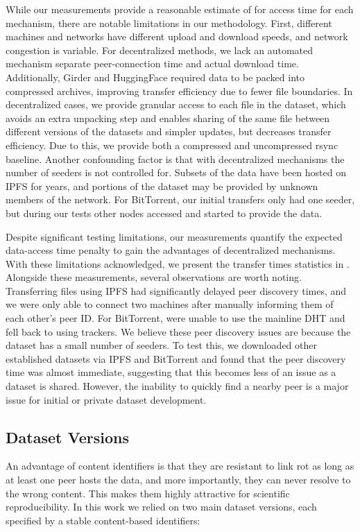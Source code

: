 While our measurements provide a reasonable estimate of for access time for each mechanism, there are
  notable limitations in our methodology.
First, different machines and networks have different upload and download speeds, and network congestion is
  variable.
For decentralized methods, we lack an automated mechanism separate peer-connection time and actual download
  time.
Additionally, Girder and HuggingFace required data to be packed into compressed archives, improving transfer
  efficiency due to fewer file boundaries.
In decentralized cases, we provide granular access to each file in the dataset, which avoids an extra
  unpacking step and enables sharing of the same file between different versions of the datasets and simpler
  updates, but decreases transfer efficiency.
Due to this, we provide both a compressed and uncompressed rsync baseline.
Another confounding factor is that with decentralized mechanisms the number of seeders is not controlled
  for.
Subsets of the data have been hosted on IPFS for years, and portions of the dataset may be provided by
  unknown members of the network.
For BitTorrent, our initial transfers only had one seeder, but during our tests other nodes accessed and
  started to provide the data.

Despite significant testing limitations, our measurements quantify the expected data-access time penalty to
  gain the advantages of decentralized mechanisms.
With these limitations acknowledged, we present the transfer times statistics in .
Alongside these measurements, several observations are worth noting.
Transferring files using IPFS had significantly delayed peer discovery times, and we were only able to
  connect two machines after manually informing them of each other's peer ID.
For BitTorrent, were unable to use the mainline DHT and fell back to using trackers.
We believe these peer discovery issues are because the dataset has a small number of seeders.
To test this, we downloaded other established datasets via IPFS and BitTorrent and found that the peer
  discovery time was almost immediate, suggesting that this becomes less of an issue as a dataset is shared.
However, the inability to quickly find a nearby peer is a major issue for initial or private dataset
  development.


\subsection{Dataset Versions}

An advantage of content identifiers is that they are resistant to link rot as long as at least one peer
  hosts the data, and more importantly, they can never resolve to the wrong content.
This makes them highly attractive for scientific reproducibility.
In this work we relied on two main dataset versions, each specified by a stable content-based identifiers:

